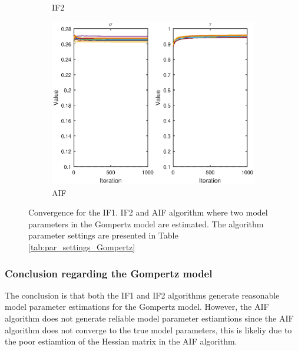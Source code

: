 \documentclass[twoside,openright]{report}
\begin{document}
\begin{figure}
\begin{subfigure}[b]{0.7\textwidth}
            \caption[]%
            { \small IF2 }     
            \label{fig:mean and std of net24}
        \end{subfigure}
        \begin{subfigure}[b]{0.7\textwidth}   
            \centering 
            \includegraphics[width=\textwidth]{./fig_gompertz/AIF_2_par}
            \caption[]%
            { \small AIF } 
            \label{fig:mean and std of net34}
        \end{subfigure}
        \caption[ ]
        {\small Convergence for the IF1. IF2 and AIF algorithm where two model parameters in the Gompertz model are estimated. The algorithm parameter settings are presented in Table \ref{tab:par_settings_Gompertz} }
        \label{fig:cov_two_par}
\end{figure}

\subsubsection{Conclusion regarding the Gompertz model}
The conclusion is that both the IF1 and IF2 algorithms generate reasonable model parameter estimations for the Gompertz model. However, the AIF algorithm does not generate reliable model parameter estiamtions since the AIF algorithm  does not converge to the true model parameters, this is likeliy due to the poor estiamtion of the Hessian matrix in the AIF algorithm. 


\end{document}
